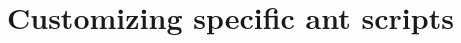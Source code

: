\documentclass[a4paper,twoside,11pt,bibtotoc]{article}
\begin{document}
\section{Customizing specific ant scripts}
\label{sec:customize}

\label{sec:override}

\clearpage
 
%
%
%
\end{document}
